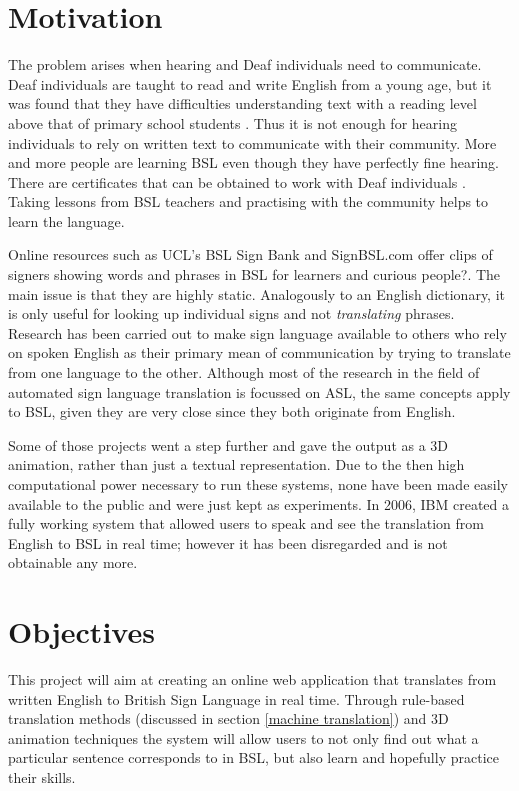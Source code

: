 \documentclass[12pt]{ociamthesis}  %
\begin{document}
\section{Motivation}
The problem arises when hearing and Deaf individuals need to communicate. Deaf individuals are taught to read and write English from a young age, but it was found that they have difficulties understanding text with a reading level above that of primary school students . Thus it is not enough for hearing individuals to rely on written text to communicate with their community. More and more people are learning BSL even though they have perfectly fine hearing. There are certificates that can be obtained to work with Deaf individuals . Taking lessons from BSL teachers and practising with the community helps to learn the language.

Online resources such as UCL's BSL Sign Bank  and SignBSL.com  offer clips of signers showing words and phrases in BSL for learners and curious people?. The main issue is that they are highly static. Analogously to an English dictionary, it is only useful for looking up individual signs and not \textit{translating} phrases. Research has been carried out to make sign language available to others who rely on spoken English as their primary mean of communication by trying to translate from one language to the other. Although most of the research in the field of automated sign language translation is focussed on ASL, the same concepts apply to BSL, given they are very close since they both originate from English.

Some of those projects went a step further and gave the output as a 3D animation, rather than just a textual representation. Due to the then high computational power necessary to run these systems, none have been made easily available to the public and were just kept as experiments. In 2006, IBM created a fully working system  that allowed users to speak and see the translation from English to BSL in real time; however it has been disregarded and is not obtainable any more. 

\section{Objectives}
This project will aim at creating an online web application that translates from written English to British Sign Language in real time. Through rule-based translation methods (discussed in section \ref{machine translation}) and 3D animation techniques the system will allow users to not only find out what a particular sentence corresponds to in BSL, but also learn and hopefully practice their skills.
\end{document}
